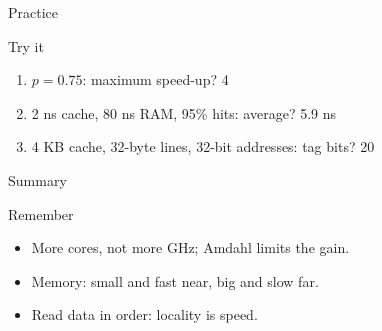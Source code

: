 \documentclass[aspectratio=169, 11pt, t, xcolor={table}]{beamer}
\begin{document}
\begin{frame}{Practice}
    \begin{obox}{\faEdit\quad Try it}
        \begin{enumerate}
            \item $p = 0.75$: maximum speed-up? \hfill \textcolor{brandMuted}{4}
            \item 2 ns cache, 80 ns RAM, 95\% hits: average? \hfill \textcolor{brandMuted}{5.9 ns}
            \item 4 KB cache, 32-byte lines, 32-bit addresses: tag bits? \hfill \textcolor{brandMuted}{20}
        \end{enumerate}
    \end{obox}
\end{frame}

\begin{frame}{Summary}
    \begin{tbox}{\faCheckCircle\quad Remember}
        \begin{itemize}
            \item More cores, not more GHz; Amdahl limits the gain.
            \item Memory: small and fast near, big and slow far.
            \item Read data in order: locality is speed.
        \end{itemize}
    \end{tbox}
\end{frame}
\end{document}
